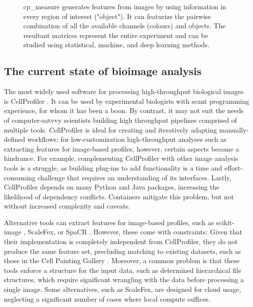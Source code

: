 \documentclass{article}
\begin{document}
\begin{figure}[htbp]
\centering

\caption{\label{fig:overview}cp\_measure generates features from images by using information in every region of interest ("object"). It can featurize the pairwise combination of all the available channels (colours) and objects. The resultant matrices represent the entire experiment and can be studied using statistical, machine, and deep learning methods.}
\end{figure}

\subsection{The current state of bioimage analysis}
\label{sec:org8f5b33d}
The most widely used software for processing high-throughput biological images is CellProfiler \citep{stirlingCellProfiler4Improvements2021}. It can be used by experimental biologists with scant programming experience, for whom it has been a boon. By contrast, it may not suit the needs of computer-satvvy scientists building high throughput pipelines comprised of multiple tools. CellProfiler is ideal for creating and iteratively adapting manually-defined workflows; for low-customization high-throughput analyses such as extracting features for image-based profiles, however, certain aspects become a hindrance. For example, complementing CellProfiler with other image analysis tools is a struggle, as building plug-ins to add functionality is a time and effort-consuming challenge that requires an understanding of its interfaces. Lastly, CellProfiler depends on many Python and Java packages, increasing the likelihood of dependency conflicts. Containers mitigate this problem, but not without increased complexity and caveats.

Alternative tools can extract features for image-based profiles, such as scikit-image \citep{waltScikitimageImageProcessing2014}, ScaleFex, or SpaCR \citep{comoletHighlyEfficientScalable2024,einarolafssonSpaCr2025}. However, these come with constraints: Given that their implementation is completely independent from CellProfiler, they do not produce the same feature set, precluding matching to existing datasets, such as those in the Cell Painting Gallery \cite{weisbartCellPaintingGallery2024,fayRxRx3PhenomicsMap2023}. Moreover, a common problem is that these tools enforce a structure for the input data, such as determined hierarchical file structures, which require significant wrangling with the data before processing a single image. Some alternatives, such as ScaleFex, are designed for cloud usage, neglecting a significant number of cases where local compute suffices. 
\end{document}
